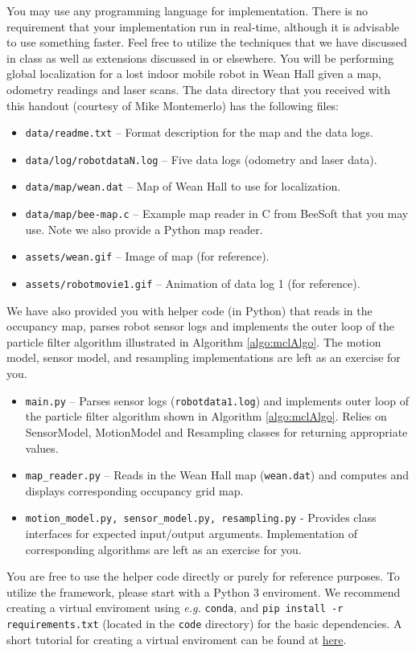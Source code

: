 \documentclass[12pt, a4paper]{article}
\begin{document}
You may use any programming language for implementation. There is
no requirement that your implementation run in real-time, although it is advisable to use something
faster. Feel free to utilize the techniques that we have
discussed in class as well as extensions discussed in \cite{thrun2005probabilistic} or elsewhere.
You will be performing global localization for a lost indoor mobile
robot in Wean Hall given a map, odometry readings and laser scans.
The data directory that you received with this handout (courtesy of
Mike Montemerlo) has the following files:
\begin{itemize}
	\item \texttt{data/readme.txt} -- Format description for the map and the
	      data logs.
	\item \texttt{data/log/robotdataN.log} -- Five data logs (odometry and laser
	      data).
	\item \texttt{data/map/wean.dat} -- Map of Wean Hall to use for localization.
	\item \texttt{data/map/bee-map.c} -- Example map reader in C from BeeSoft that you may use. Note we also provide a Python map reader.
	\item \texttt{assets/wean.gif} -- Image of map (for reference).
	\item \texttt{assets/robotmovie1.gif} -- Animation of data log 1 (for reference).
\end{itemize}

We have also provided you with helper code (in Python) that reads
in the occupancy map, parses robot sensor logs and implements the
outer loop of the particle filter algorithm illustrated in Algorithm
\ref{algo:mclAlgo}. The motion model, sensor model, and resampling
implementations are left as an exercise for you.
\begin{itemize}
	\item \texttt{main.py} -- Parses sensor logs (\texttt{robotdata1.log})
	      and implements outer loop of the particle filter algorithm shown in
	      Algorithm \ref{algo:mclAlgo}. Relies on SensorModel, MotionModel
	      and Resampling classes for returning appropriate values.
	\item \texttt{map\_reader.py} -- Reads in the Wean Hall map (\texttt{wean.dat})
	      and computes and displays corresponding occupancy grid map.
	\item \texttt{motion\_model.py, sensor\_model.py, resampling.py} - Provides
	      class interfaces for expected input/output arguments. Implementation
	      of corresponding algorithms are left as an exercise for you.
\end{itemize}
You are free to use the helper code directly or purely for reference
purposes. To utilize the framework, please start with a Python 3 enviroment. We recommend creating a virtual enviroment
using \emph{e.g.} \texttt{conda}, and \texttt{pip install -r requirements.txt} (located in the \texttt{code} directory) for the basic dependencies. A short tutorial for creating a virtual enviroment can be found at \href{https://docs.google.com/document/d/1iAuVGllpk3RMZzBl-kGaA2AlF8Jg5cs00y0ZwkOZ08E/edit}{here}.
\end{document}
